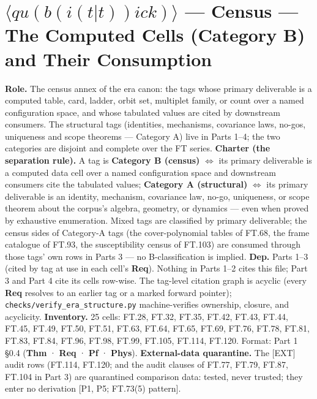 \chapter{\texorpdfstring{$\langle qu(b(i(t|t))ick)\rangle$ — \textbf{Census} — The Computed Cells (Category B) and Their Consumption}{Qubitick - **Census** - The Computed Cells (Category B) and Their Consumption}}

\textbf{Role.} The census annex of the era canon: the tags whose primary deliverable is a computed table, card, ladder, orbit set, multiplet family, or count over a named configuration space, and whose tabulated values are cited by downstream consumers. The structural tags (identities, mechanisms, covariance laws, no-gos, uniqueness and scope theorems — Category A) live in Parts 1–4; the two categories are disjoint and complete over the FT series. \textbf{Charter (the separation rule).} A tag is \textbf{Category B (census)} $\iff$ its primary deliverable is a computed data cell over a named configuration space and downstream consumers cite the tabulated values; \textbf{Category A (structural)} $\iff$ its primary deliverable is an identity, mechanism, covariance law, no-go, uniqueness, or scope theorem about the corpus's algebra, geometry, or dynamics — even when proved by exhaustive enumeration. Mixed tags are classified by primary deliverable; the census sides of Category-A tags (the cover-polynomial tables of FT.68, the frame catalogue of FT.93, the susceptibility census of FT.103) are consumed through those tags' own rows in Parts 3 — no B-classification is implied. \textbf{Dep.} Parts 1–3 (cited by tag at use in each cell's \textbf{Req}). Nothing in Parts 1–2 cites this file; Part 3 and Part 4 cite its cells row-wise. The tag-level citation graph is acyclic (every \textbf{Req} resolves to an earlier tag or a marked forward pointer); \texttt{checks/\allowbreak{}verify\_\allowbreak{}era\_\allowbreak{}structure.py} machine-verifies ownership, closure, and acyclicity. \textbf{Inventory.} 25 cells: FT.28, FT.32, FT.35, FT.42, FT.43, FT.44, FT.45, FT.49, FT.50, FT.51, FT.63, FT.64, FT.65, FT.69, FT.76, FT.78, FT.81, FT.83, FT.84, FT.96, FT.98, FT.99, FT.105, FT.114, FT.120. Format: Part 1 §0.4 (\textbf{Thm} · \textbf{Req} · \textbf{Pf} · \textbf{Phys}). \textbf{External-data quarantine.} The [EXT] audit rows (FT.114, FT.120; and the audit clauses of FT.77, FT.79, FT.87, FT.104 in Part 3) are quarantined comparison data: tested, never trusted; they enter no derivation [P1, P5; FT.73(5) pattern].

